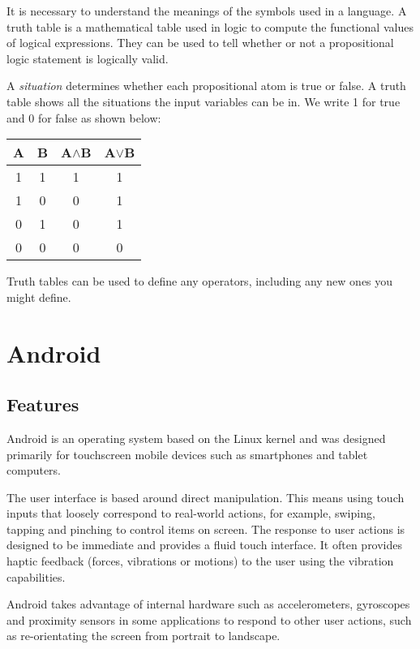 \documentclass{report}
\begin{document}
It is necessary to understand the meanings of the symbols used in a language. A truth table is a mathematical table used in logic to compute the functional values of logical expressions. They can be used to tell whether or not a propositional logic statement is logically valid.

A \textit{situation} determines whether each propositional atom is true or false. A truth table shows all the situations the input variables can be in. We write 1 for true and 0 for false as shown below:

\vspace{5 mm}
\begin{center}
  \begin{tabular}{ || c | c || c | c || }
    \hline
    A & B & A$\land$B & A$\lor$B \\ \hline
    1 & 1 & 1 & 1 \\
    1 & 0 & 0 & 1\\
    0 & 1 & 0 & 1 \\
    0 & 0 & 0 & 0 \\
    \hline
  \end{tabular}
\end{center}
\vspace{5 mm}

Truth tables can be used to define any operators, including any new ones you might define.

\section{Android}

\subsection{Features}

Android is an operating system based on the Linux kernel and was designed primarily for touchscreen mobile devices such as smartphones and tablet computers.

The user interface is based around direct manipulation. This means using touch inputs that loosely correspond to real-world actions, for example, swiping, tapping and pinching to control items on screen. The response to user actions is designed to be immediate and provides a fluid touch interface. It often provides haptic feedback (forces, vibrations or motions) to the user using the vibration capabilities.

Android takes advantage of internal hardware such as accelerometers, gyroscopes and proximity sensors in some applications to respond to other user actions, such as re-orientating the screen from portrait to landscape.
\end{document}
